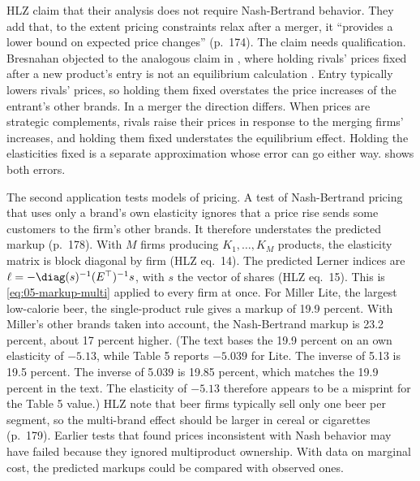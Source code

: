 HLZ claim that their analysis does not require Nash-Bertrand behavior. They add that, to the extent pricing
constraints relax after a merger, it ``provides a lower bound on expected price changes'' (p.~174). The claim needs qualification. Bresnahan objected to the analogous claim in \citet{Hausman1997}, where
holding rivals' prices fixed after a new product's entry is not an equilibrium calculation
\citep[pp.~244--245]{Bresnahan1997}. Entry typically lowers rivals' prices, so holding them fixed overstates the
price increases of the entrant's other brands. In a merger the direction differs. When prices are strategic
complements, rivals raise their prices in response to the merging firms' increases, and holding them fixed
understates the equilibrium effect. Holding the elasticities fixed is a separate approximation whose error can
go either way.  shows both errors.

The second application tests models of pricing. A test of Nash-Bertrand pricing that uses only a brand's own
elasticity ignores that a price rise sends some customers to the firm's other brands. It therefore understates
the predicted markup (p.~178). With $M$ firms producing $K_1,\dots,K_M$ products, the elasticity matrix is block
diagonal by firm (HLZ eq.~14). The predicted Lerner indices are $\ell = -\diag(s)^{-1}(E^\top)^{-1}s$, with $s$
the vector of shares (HLZ eq.~15). This is \eqref{eq:05-markup-multi} applied to every firm at
once. For Miller Lite, the largest low-calorie beer, the single-product rule gives a markup of 19.9 percent. With
Miller's other brands taken into account, the Nash-Bertrand markup is 23.2 percent, about 17 percent higher.
(The text bases the 19.9 percent on an own elasticity of $-5.13$, while Table 5 reports $-5.039$ for Lite. The
inverse of 5.13 is 19.5 percent. The inverse of 5.039 is 19.85 percent, which matches the 19.9 percent in the
text. The elasticity of $-5.13$ therefore appears to be a misprint for the Table 5 value.) HLZ note that beer firms
typically sell only one beer per segment, so the multi-brand effect should be larger in cereal or cigarettes
(p.~179). Earlier tests that found prices inconsistent with Nash behavior may have failed because they ignored
multiproduct ownership. With data on marginal cost, the predicted markups could be compared with observed ones.

